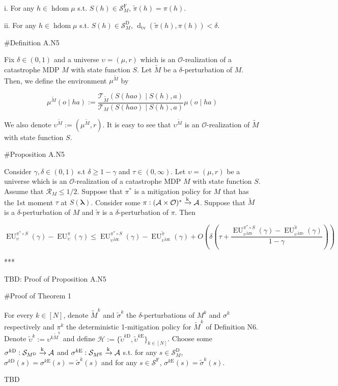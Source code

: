 \documentclass[a4paper]{article}
\newcommand{\AP}[1]{\left(#1\right)}
\newcommand{\Dtva}[1]{\operatorname{d}_{\text{tv}}\AP{#1}}
\newcommand{\Estr}{\boldsymbol{\lambda}}
\newcommand{\M}{\xrightarrow{\textnormal{k}}}
\newcommand{\Ob}{\mathcal{O}}
\newcommand{\A}{\mathcal{A}}
\newcommand{\St}{\mathcal{S}}
\newcommand{\T}{\mathcal{T}}
\newcommand{\R}{\mathcal{R}}
\newcommand{\FH}{(\A \times \Ob)^*}
\DeclareMathOperator{\HD}{hdom}
\newcommand{\Hy}{\mathcal{H}}
\newcommand{\RMD}{\mathrm{D}}
\newcommand{\RME}{\mathrm{E}}
\newcommand{\RMF}{\mathrm{F}}
\newcommand{\SF}{\St^{\RMF}}
\newcommand{\SD}{\St^{\RMD}}
\newcommand{\MD}{M^{\RMD}}
\newcommand{\ME}{M^{\RME}}
\newcommand{\EU}{\operatorname{EU}}
\begin{document}
i. For any $h \in \HD{\mu}$ s.t. $S(h)\in\SF_M$, $\tilde{\pi}(h)=\pi(h)$.

ii. For any $h \in \HD{\mu}$ s.t. $S(h)\in\SD_M$, $\Dtva{\tilde{\pi}(h),\pi(h)} < \delta$.


\#Definition A.N5

Fix $\delta\in(0,1)$ and a universe $\upsilon=(\mu,r)$ which is an $\Ob$-realization of a catastrophe MDP $M$ with state function $S$. Let $\tilde{M}$ be a $\delta$-perturbation of $M$. Then, we define the environment $\mu^{\tilde{M}}$ by

$$\mu^{\tilde{M}}(o \mid ha) := \frac{\T_{\tilde{M}}\AP{S(hao) \mid S(h),a}}{\T_{M}\AP{S(hao) \mid S(h),a}}\mu(o \mid ha)$$

We also denote $\upsilon^{\tilde{M}}:=\AP{\mu^{\tilde{M}},r}$. It is easy to see that $\upsilon^{\tilde{M}}$ is an $\Ob$-realization of $\tilde{M}$ with state function $S$.

\#Proposition A.N5

Consider $\gamma,\delta\in(0,1)$ s.t $\delta \geq 1 - \gamma$ and $\tau\in(0,\infty)$. Let $\upsilon=(\mu,r)$ be a universe which is an $\Ob$-realization of a catastrophe MDP $M$ with state function $S$. Assume that $\R_M \leq 1/2$. Suppose that $\pi^*$ is a mitigation policy for $M$ that has the 1st moment $\tau$ at $S(\Estr)$. Consider some $\pi: \FH \M \A$. Suppose that $\tilde{M}$ is a $\delta$-perturbation of $M$ and $\tilde{\pi}$ is a $\delta$-perturbation of $\pi$. Then

$$\EU_{\upsilon}^{\pi^* \circ S}(\gamma)-\EU_{\upsilon}^{\pi}(\gamma) \leq \EU_{\upsilon^{\tilde{M}\RME}}^{\pi^* \circ S}(\gamma)-\EU_{\upsilon^{\tilde{M}\RME}}^{\tilde{\pi}}(\gamma)   + O\AP{\delta\AP{\tau+\frac{\EU_{\upsilon^{\tilde{M}\RMD}}^{\pi^* \circ S}(\gamma)-\EU_{\upsilon^{\tilde{M}\RMD}}^{\tilde{\pi}}(\gamma)}{1-\gamma}}}$$

***

TBD: Proof of Proposition A.N5

\#Proof of Theorem 1

For every $k \in [N]$, denote $\tilde{M}^k$ and $\tilde{\sigma}^k$ the $\delta$-perturbations of $M^k$ and $\sigma^k$ respectively and $\pi^k$ the deterministic 1-mitigation policy for $\tilde{M}^k$ of Definition N6. Denote $\tilde{\upsilon}^k:=\upsilon^{k\tilde{M}^k}$ and define $\Hy:=\{\tilde{\upsilon}^{k\RMD},\tilde{\upsilon}^{k\RME}\}_{k \in [N]}$. Choose some $\sigma^{k\RMD}: \St_{\MD} \M \A$ and $\sigma^{k\RME}: \St_{\ME} \M \A$ s.t. for any $s \in \SD_M$, $\sigma^{k\RMD}(s) = \sigma^{k\RME}(s) = \tilde{\sigma}^k(s)$ and for any $s \in \SF$, $\sigma^{k\RME}(s) = \tilde{\sigma}^k(s)$.


TBD
\end{document}
